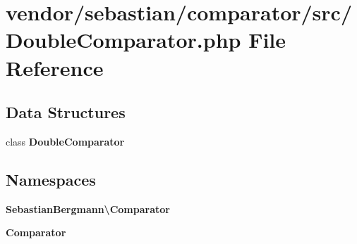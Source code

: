 \section{vendor/sebastian/comparator/src/\+Double\+Comparator.php File Reference}
\label{_double_comparator_8php}
\subsection*{Data Structures}
\begin{DoxyCompactItemize}
\item 
class {\bf Double\+Comparator}
\end{DoxyCompactItemize}
\subsection*{Namespaces}
\begin{DoxyCompactItemize}
\item 
 {\bf Sebastian\+Bergmann\textbackslash{}\+Comparator}
\item 
 {\bf Comparator}
\end{DoxyCompactItemize}
